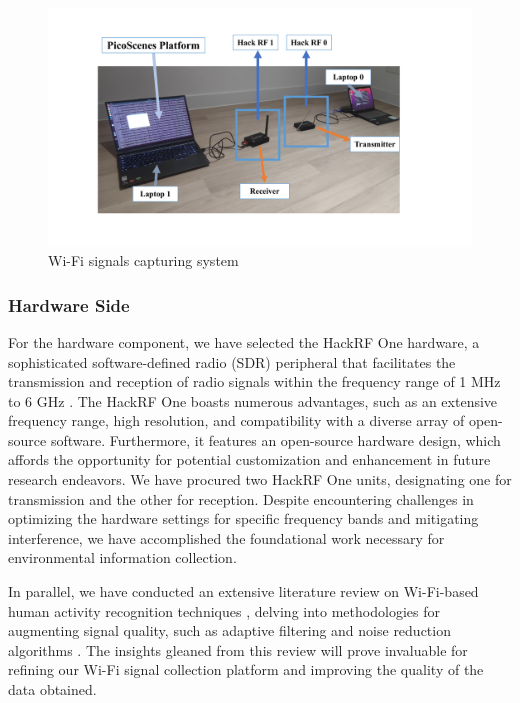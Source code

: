 \documentclass[12pt, a4paper]{article}
\begin{document}
\begin{figure}[ht!]
    \centering
    \includegraphics[width=1.0\textwidth]{image/wifi.pdf}
    \caption{Wi-Fi signals capturing system}
    \label{fig:wifi}
\end{figure}


\subsubsection{Hardware Side}
For the hardware component, we have selected the HackRF One hardware, a sophisticated software-defined radio (SDR) peripheral that facilitates the transmission and reception of radio signals within the frequency range of 1 MHz to 6 GHz \cite{ossmann2018hackrf}. The HackRF One boasts numerous advantages, such as an extensive frequency range, high resolution, and compatibility with a diverse array of open-source software. Furthermore, it features an open-source hardware design, which affords the opportunity for potential customization and enhancement in future research endeavors. We have procured two HackRF One units, designating one for transmission and the other for reception. Despite encountering challenges in optimizing the hardware settings for specific frequency bands and mitigating interference, we have accomplished the foundational work necessary for environmental information collection.

In parallel, we have conducted an extensive literature review on Wi-Fi-based human activity recognition techniques \cite{wang2016wifi}, delving into methodologies for augmenting signal quality, such as adaptive filtering and noise reduction algorithms \cite{karedal2007measurement}. The insights gleaned from this review will prove invaluable for refining our Wi-Fi signal collection platform and improving the quality of the data obtained.
\end{document}
